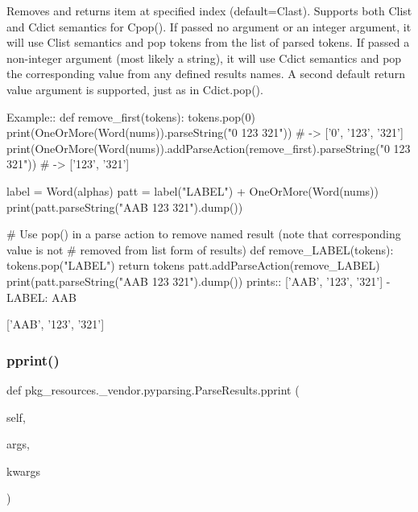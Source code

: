 \begin{DoxyVerb}Removes and returns item at specified index (default=C{last}).
Supports both C{list} and C{dict} semantics for C{pop()}. If passed no
argument or an integer argument, it will use C{list} semantics
and pop tokens from the list of parsed tokens. If passed a 
non-integer argument (most likely a string), it will use C{dict}
semantics and pop the corresponding value from any defined 
results names. A second default return value argument is 
supported, just as in C{dict.pop()}.

Example::
    def remove_first(tokens):
tokens.pop(0)
    print(OneOrMore(Word(nums)).parseString("0 123 321")) # -> ['0', '123', '321']
    print(OneOrMore(Word(nums)).addParseAction(remove_first).parseString("0 123 321")) # -> ['123', '321']

    label = Word(alphas)
    patt = label("LABEL") + OneOrMore(Word(nums))
    print(patt.parseString("AAB 123 321").dump())

    # Use pop() in a parse action to remove named result (note that corresponding value is not
    # removed from list form of results)
    def remove_LABEL(tokens):
tokens.pop("LABEL")
return tokens
    patt.addParseAction(remove_LABEL)
    print(patt.parseString("AAB 123 321").dump())
prints::
    ['AAB', '123', '321']
    - LABEL: AAB

    ['AAB', '123', '321']
\end{DoxyVerb}
 \mbox{\label{classpkg__resources_1_1__vendor_1_1pyparsing_1_1ParseResults_a584f4c008b1c702a394e8295d878edda}} 
\subsubsection{\texorpdfstring{pprint()}{pprint()}}
{\footnotesize\ttfamily def pkg\+\_\+resources.\+\_\+vendor.\+pyparsing.\+Parse\+Results.\+pprint (\begin{DoxyParamCaption}\item[{}]{self,  }\item[{}]{args,  }\item[{}]{kwargs }\end{DoxyParamCaption})}


